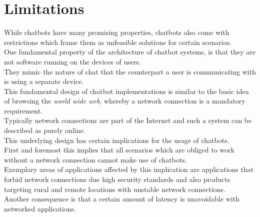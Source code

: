 \section{Limitations}
\label{limitations}


While chatbots have many promising properties, chatbots also come with restrictions
which frame them as unfeasible solutions for certain scenarios.
\\

One fundamental property of the architecture of chatbot systems,
is that they are not software running on the devices of users.
\\
They mimic the nature of chat that the counterpart a user is communicating with is using a separate device.
\\
This fundamental design of chatbot implementations is similar to the basic
idea of browsing the \emph{world wide web}, whereby a network connection is a mandatory requirement.
\\
Typically network connections are part of the Internet
and such a system can be described as purely online.
\\

This underlying design has certain implications for the usage of chatbots.
\\

First and foremost this implies that all scenarios which are obliged to work without a network connection
cannot make use of chatbots.
\\
Exemplary areas of applications affected by this implication are
applications that forbid network connections due high security standards
and also products targeting rural and remote locations with unstable network connections.
\\

Another consequence is that a certain amount of latency is unavoidable with networked applications.
\\

